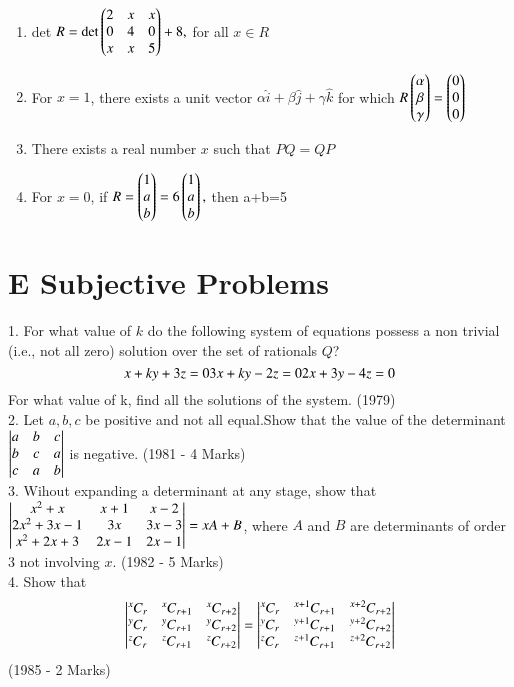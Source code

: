 \documentclass[journal,12pt,twocolumn]{IEEEtran}
\newcommand\Comb[2][^n]{\prescript{#1\mkern-0.5mu}{}C_{#2}}
\theoremstyle{remark}
\begin{document}
\begin{enumerate}
\item det $R = \text{det}\begin{pmatrix}2&x&x\\0&4&0\\x&x&5\end{pmatrix}+8,$ for all $x\in R$
\item For $x=1$, there exists a unit vector $\alpha\hat{i}+\beta\hat{j}+\gamma\hat{k}$ for which $R\begin{pmatrix}\alpha\\\beta\\\gamma\end{pmatrix}=\begin{pmatrix}0\\0\\0\end{pmatrix}$
		\item There exists a real number $x$ such that $PQ = QP$
		\item For $x=0$, if $R=\begin{pmatrix}1\\a\\b\end{pmatrix}=6\begin{pmatrix}1\\a\\b\end{pmatrix},$ then a+b=5\\[2pt]
\end{enumerate}

\section{E Subjective Problems}

1. For what value of $k$ do the following system of equations possess a non trivial (i.e., not all zero) solution over the set of rationals $Q$?
$$x+ky+3z=0\\3x+ky-2z=0\\2x+3y-4z=0$$ For what value of k, find all the solutions of the system. \hfill (1979)\\[2pt]

2. Let $a,b,c$ be positive and not all equal.Show that the value of the determinant $\begin{vmatrix}a&b&c\\b&c&a\\c&a&b\end{vmatrix}$ is negative. \hfill (1981 - 4 Marks)\\[2pt]

3. Wihout expanding a determinant at any stage, show that $\begin{vmatrix}x^2+x&x+1&x-2\\2x^2+3x-1&3x&3x-3\\x^2+2x+3&2x-1&2x-1\end{vmatrix}=xA+B$, where $A$ and $B$ are determinants of order 3 not involving $x$. \hfill (1982 - 5 Marks)\\[2pt]

4. Show that $$\mydet{\Comb[x]{r}&\Comb[x]{r+1}&\Comb[x]{r+2}\\\Comb[y]{r}&\Comb[y]{r+1}&\Comb[y]{r+2}\\\Comb[z]{r}&\Comb[z]{r+1}&\Comb[z]{r+2}}=\mydet{\Comb[x]{r}&\Comb[x+1]{r+1}&\Comb[x+2]{r+2}\\\Comb[y]{r}&\Comb[y+1]{r+1}&\Comb[y+2]{r+2}\\\Comb[z]{r}&\Comb[z+1]{r+1}&\Comb[z+2]{r+2}}$$ \hfill (1985 - 2 Marks)\\[2pt]
\end{document}
